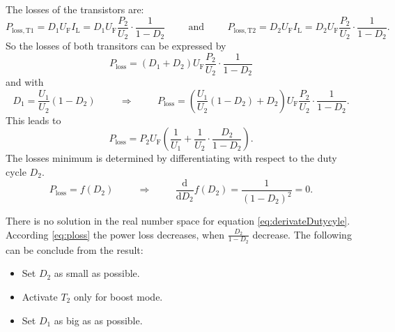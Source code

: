 \begin{solutionblock}
    The losses of the transistors are:
    \begin{equation}
        P_\mathrm{loss,T1}=D_1 U_\mathrm{F} I_\mathrm{L}=D_1 U_\mathrm{F} \frac{P_\mathrm{2}}{U_\mathrm{2}} \cdot \frac{1}{1-D_2}
        \hspace{1cm} \mathrm{and} \hspace{1cm}
        P_\mathrm{loss,T2}=D_2 U_\mathrm{F} I_\mathrm{L}=D_2 U_\mathrm{F} \frac{P_\mathrm{2}}{U_\mathrm{2}} \cdot \frac{1}{1-D_2}.
    \end{equation}
    So the losses of both transitors can be expressed by
    \begin{equation}
        P_\mathrm{loss}=\left(D_1 +D_2\right) U_\mathrm{F} \frac{P_\mathrm{2}}{U_\mathrm{2}} \cdot \frac{1}{1-D_2}
    \end{equation}
    and with
    \begin{equation}
        D_1 =\frac{U_\mathrm{1}}{U_\mathrm{2}} \left(1 - D_2 \right) 
        \hspace{1cm} \Rightarrow \hspace{1cm}
        P_\mathrm{loss}=\left(\frac{U_\mathrm{1}}{U_\mathrm{2}} \left(1 - D_2 \right)+D_2\right) U_\mathrm{F} \frac{P_\mathrm{2}}{U_\mathrm{2}} \cdot \frac{1}{1-D_2}.
    \end{equation}
    This leads to
    \begin{equation}
        P_\mathrm{loss}=P_\mathrm{2} U_\mathrm{F} \left(\frac{1}{U_\mathrm{1}} + 
        \frac{1}{U_\mathrm{2}} \cdot \frac{D_2}{1-D_2}\right).
        \label{eq:ploss}
    \end{equation}
    The losses minimum is determined by differentiating with respect to the duty cycle $D_2$.    
    \begin{equation}
        P_\mathrm{loss}=f(D_2)
        \hspace{1cm} \Rightarrow \hspace{1cm}
        \frac{\mathrm{d}}{\mathrm{d}D_2} f(D_2)= \frac{1}{\left(1 - D_2 \right)^2}=0.
        \label{eq:derivateDutycyle}
    \end{equation}

    There is no solution in the real number space for equation \eqref{eq:derivateDutycyle}.
    According \eqref{eq:ploss} the power loss decreases, when $\frac{D_2}{1-D_2}$ decrease.
    The following can be conclude from the result:
    \begin{itemize}
        \item Set $D_2$ as small as possible.
        \item Activate $T_2$ only for boost mode.
        \item Set $D_1$ as big as as possible.
    \end{itemize}     
\end{solutionblock}

